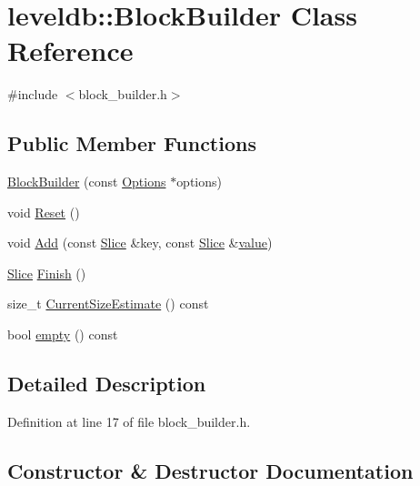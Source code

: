 \hypertarget{classleveldb_1_1_block_builder}{}\section{leveldb\+:\+:Block\+Builder Class Reference}
\label{classleveldb_1_1_block_builder}


{\ttfamily \#include $<$block\+\_\+builder.\+h$>$}

\subsection*{Public Member Functions}
\begin{DoxyCompactItemize}
\item 
\hyperlink{classleveldb_1_1_block_builder_a697ffa03ff6e8f5dec0558c05136f89c}{Block\+Builder} (const \hyperlink{structleveldb_1_1_options}{Options} $\ast$options)
\item 
void \hyperlink{classleveldb_1_1_block_builder_a812168608c24de2dfa1651fcdd88e49b}{Reset} ()
\item 
void \hyperlink{classleveldb_1_1_block_builder_a17d0e23f1e7afcb874b22a0cb0b6cf17}{Add} (const \hyperlink{classleveldb_1_1_slice}{Slice} \&key, const \hyperlink{classleveldb_1_1_slice}{Slice} \&\hyperlink{cache_8cc_a0f61d63b009d0880a89c843bd50d8d76}{value})
\item 
\hyperlink{classleveldb_1_1_slice}{Slice} \hyperlink{classleveldb_1_1_block_builder_ab345ab44def13fb180502e9637b28bcd}{Finish} ()
\item 
size\+\_\+t \hyperlink{classleveldb_1_1_block_builder_a836fd5dfd46b72d2438a7d59a984a72f}{Current\+Size\+Estimate} () const 
\item 
bool \hyperlink{classleveldb_1_1_block_builder_ae8d2223984da12b810124688aa56fdcd}{empty} () const 
\end{DoxyCompactItemize}


\subsection{Detailed Description}


Definition at line 17 of file block\+\_\+builder.\+h.



\subsection{Constructor \& Destructor Documentation}
\hypertarget{classleveldb_1_1_block_builder_a697ffa03ff6e8f5dec0558c05136f89c}{}
